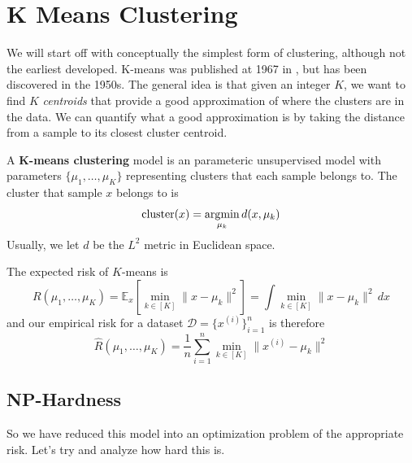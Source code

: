 \section{K Means Clustering} 

  We will start off with conceptually the simplest form of clustering, although not the earliest developed. K-means was published at 1967 in \cite{1967macqueen}, but has been discovered in the 1950s. The general idea is that given an integer $K$, we want to find $K$ \textit{centroids} that provide a good approximation of where the clusters are in the data. We can quantify what a good approximation is by taking the distance from a sample to its closest cluster centroid.

  \begin{definition}
    \label{def:k-means-clustering}
    A \textbf{K-means clustering} model is an parameteric unsupervised model with parameters $\{\mu_1, \ldots, \mu_K\}$ representing clusters that each sample belongs to. The cluster that sample $x$ belongs to is 
    \begin{equation}
      \mathrm{cluster}(x) = \operatorname*{\arg\!\min}_{\mu_k} d(x, \mu_k)
    \end{equation}
    Usually, we let $d$ be the $L^2$ metric in Euclidean space. 
  \end{definition}

  \begin{theorem}[Risk]
    \label{thm:risk}
    The expected risk of $K$-means is 
    \begin{equation}
      R(\mu_1, \ldots, \mu_K) = \mathbb{E}_x \left[ \min_{k \in [K]} \| x - \mu_k \|^2 \right] = \int \min_{k \in [K]} \| x - \mu_k \|^2 \,dx
    \end{equation} 
    and our empirical risk for a dataset $\mathcal{D} = \{x^{(i)}\}_{i=1}^n$ is therefore 
    \begin{equation}
      \hat{R}(\mu_1, \ldots, \mu_K) = \frac{1}{n} \sum_{i=1}^n \min_{k \in [K]} \| x^{(i)} - \mu_k \|^2
    \end{equation} 
  \end{theorem} 

\subsection{NP-Hardness}

  So we have reduced this model into an optimization problem of the appropriate risk. Let's try and analyze how hard this is. 

